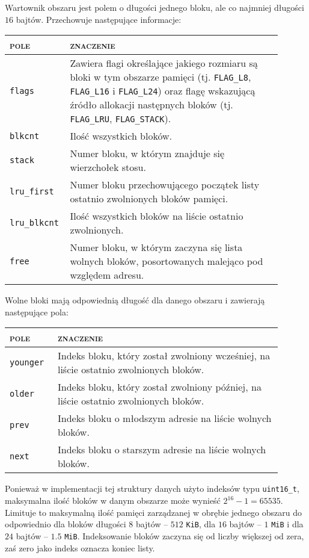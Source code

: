 \documentclass[12pt,a4paper,titlepage,twoside]{mwart}
\begin{document}
Wartownik obszaru jest polem o długości jednego bloku, ale co najmniej długości
$16$ bajtów. Przechowuje następujące informacje:
\begin{center}
\begin{tabular}{|m{0.15\linewidth}|p{0.75\linewidth}|}
\hline
\textsc{pole} & \textsc{znaczenie} \\
\hline
\hline
\verb+flags+		& Zawiera flagi określające jakiego rozmiaru są bloki w tym
obszarze pamięci (tj. \verb+FLAG_L8+, \verb+FLAG_L16+ i \verb+FLAG_L24+) oraz
flagę wskazującą źródło allokacji następnych bloków (tj. \verb+FLAG_LRU+,
\verb+FLAG_STACK+). \\
\hline
\verb+blkcnt+		& Ilość wszystkich bloków. \\
\hline
\verb+stack+		& Numer bloku, w którym znajduje się wierzchołek stosu. \\
\hline
\verb+lru_first+	& Numer bloku przechowującego początek listy ostatnio
zwolnionych bloków pamięci. \\
\hline
\verb+lru_blkcnt+	& Ilość wszystkich bloków na liście ostatnio zwolnionych. \\
\hline
\verb+free+			& Numer bloku, w którym zaczyna się lista wolnych bloków,
posortowanych malejąco pod względem adresu. \\
\hline
\end{tabular}
\end{center}

Wolne bloki mają odpowiednią długość dla danego obszaru i zawierają następujące pola:

\begin{center}
\begin{tabular}{|m{0.15\linewidth}|p{0.75\linewidth}|}
\hline
\textsc{pole} & \textsc{znaczenie} \\
\hline
\hline
\verb+younger+	& Indeks bloku, który został zwolniony wcześniej, na liście ostatnio zwolnionych bloków. \\
\hline
\verb+older+	& Indeks bloku, który został zwolniony później, na liście ostatnio zwolnionych bloków. \\
\hline
\verb+prev+		& Indeks bloku o młodszym adresie na liście wolnych bloków. \\
\hline
\verb+next+		& Indeks bloku o starszym adresie na liście wolnych bloków. \\
\hline
\end{tabular}
\end{center}

Ponieważ w implementacji tej struktury danych użyto indeksów typu
\verb+uint16_t+, maksymalna ilość bloków w danym obszarze może wynieść $2^{16}
- 1 = 65535$. Limituje to maksymalną ilość pamięci zarządzanej w obrębie
jednego obszaru do odpowiednio dla bloków długości $8$ bajtów -- $512$
\verb+KiB+, dla $16$ bajtów -- $1$ \verb+MiB+ i dla $24$ bajtów -- $1.5$
\verb+MiB+. Indeksowanie bloków zaczyna się od liczby większej od zera, zaś
zero jako indeks oznacza koniec listy.
\end{document}
